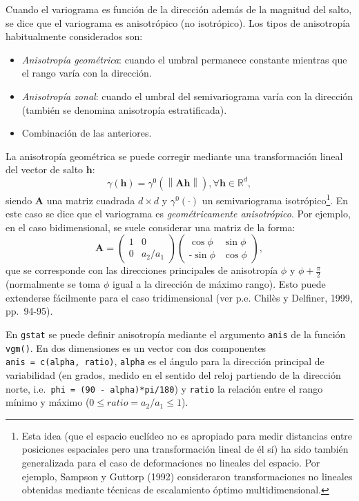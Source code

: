 \documentclass[
  spanish,
]{book}
\providecommand{\tightlist}{%
  \setlength{\itemsep}{0pt}\setlength{\parskip}{0pt}}
\theoremstyle{break}
\theoremstyle{definition}
\theoremstyle{definition}
\theoremstyle{definition}
\theoremstyle{definition}
\theoremstyle{remark}
\begin{document}
Cuando el variograma es función de la dirección además de la magnitud del salto, se dice que el variograma es anisotrópico (no isotrópico).
Los tipos de anisotropía habitualmente considerados son:

\begin{itemize}
\tightlist
\item
  \emph{Anisotropía geométrica}: cuando el umbral permanece constante mientras que el rango varía con la dirección.
\item
  \emph{Anisotropía zonal}: cuando el umbral del semivariograma varía con la dirección (también se denomina anisotropía estratificada).
\item
  Combinación de las anteriores.
\end{itemize}

La anisotropía geométrica se puede corregir mediante una transformación lineal del vector de salto \(\mathbf{h}\):
\[\gamma(\mathbf{h})=\gamma^{0} \left( \left\| \mathbf{A}\mathbf{h}\right\| \right) ,\forall \mathbf{h}\in \mathbb{R}^{d},\]
siendo \(\mathbf{A}\) una matriz cuadrada \(d\times d\) y \(\gamma^{0} (\cdot)\) un semivariograma isotrópico\footnote{Esta idea (que el espacio euclídeo no es apropiado para medir distancias entre posiciones espaciales pero una transformación lineal de él sí) ha sido también generalizada para el caso de deformaciones no lineales del espacio. Por ejemplo, Sampson y Guttorp (1992) consideraron transformaciones no lineales obtenidas mediante técnicas de escalamiento óptimo multidimensional.}.
En este caso se dice que el variograma es \emph{geométricamente anisotrópico}.
Por ejemplo, en el caso bidimensional, se suele considerar una matriz de la forma:
\[\mathbf{A}=\left( 
\begin{array}{cc}
1  & 0 \\
0 & a_2/a_1 
\end{array}
\right) \left( 
\begin{array}{cc}
\cos \phi  & \sin\phi  \\
\text{-} \sin\phi  & \cos \phi 
\end{array}
\right),\]
que se corresponde con las direcciones principales de anisotropía \(\phi\) y \(\phi + \frac{\pi }{\text{2}}\) (normalmente se toma \(\phi\) igual a la dirección de máximo rango).
Esto puede extenderse fácilmente para el caso tridimensional (ver p.e. Chilès y Delfiner, 1999, pp.~94-95).

En \texttt{gstat} se puede definir anisotropía mediante el argumento \texttt{anis} de la función \texttt{vgm()}.
En dos dimensiones es un vector con dos componentes \texttt{anis\ =\ c(alpha,\ ratio)}, \texttt{alpha} es el ángulo para la dirección principal de variabilidad (en grados, medido en el sentido del reloj partiendo de la dirección norte, i.e.~\texttt{phi\ =\ (90\ -\ alpha)*pi/180}) y \texttt{ratio} la relación entre el rango mínimo y máximo (\(0 \leq ratio = a_2/a_1 \leq 1\)).
\end{document}
